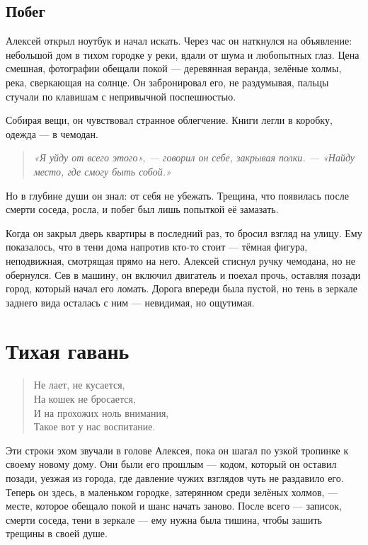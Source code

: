 \documentclass[12pt,a4paper]{book}
\newenvironment{innerthought}{\begin{quote}\small\itshape}{\end{quote}}
\begin{document}
\section{Побег}

Алексей открыл ноутбук и начал искать. Через час он наткнулся на объявление: небольшой дом в тихом городке у реки, вдали от шума и любопытных глаз. Цена смешная, фотографии обещали покой — деревянная веранда, зелёные холмы, река, сверкающая на солнце. Он забронировал его, не раздумывая, пальцы стучали по клавишам с непривычной поспешностью.

Собирая вещи, он чувствовал странное облегчение. Книги легли в коробку, одежда — в чемодан. 

\begin{innerthought}
«Я уйду от всего этого», — говорил он себе, закрывая полки. — «Найду место, где смогу быть собой.»
\end{innerthought}

Но в глубине души он знал: от себя не убежать. Трещина, что появилась после смерти соседа, росла, и побег был лишь попыткой её замазать.

Когда он закрыл дверь квартиры в последний раз, то бросил взгляд на улицу. Ему показалось, что в тени дома напротив кто-то стоит — тёмная фигура, неподвижная, смотрящая прямо на него. Алексей стиснул ручку чемодана, но не обернулся. Сев в машину, он включил двигатель и поехал прочь, оставляя позади город, который начал его ломать. Дорога впереди была пустой, но тень в зеркале заднего вида осталась с ним — невидимая, но ощутимая.

\chapter{Тихая гавань}

\begin{verse}
Не лает, не кусается,\\
На кошек не бросается,\\
И на прохожих ноль внимания,\\
Такое вот у нас воспитание.
\end{verse}

Эти строки эхом звучали в голове Алексея, пока он шагал по узкой тропинке к своему новому дому. Они были его прошлым — кодом, который он оставил позади, уезжая из города, где давление чужих взглядов чуть не раздавило его. Теперь он здесь, в маленьком городке, затерянном среди зелёных холмов, — месте, которое обещало покой и шанс начать заново. После всего — записок, смерти соседа, тени в зеркале — ему нужна была тишина, чтобы зашить трещины в своей душе.
\end{document}
